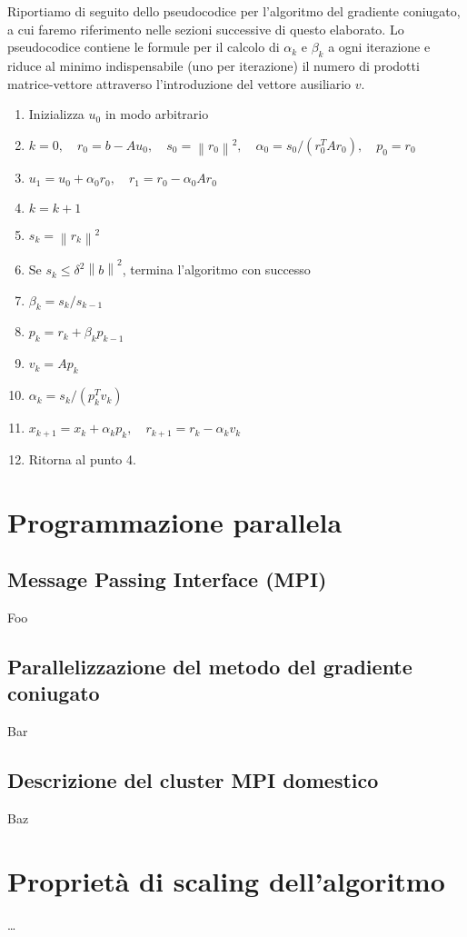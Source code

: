 \documentclass[a4paper,11pt]{article}
\newcommand{\norm}[1]{\left\lVert#1\right\rVert}
\begin{document}
Riportiamo di seguito dello pseudocodice per l'algoritmo
del gradiente coniugato, a cui faremo riferimento nelle
sezioni successive di questo elaborato.
Lo pseudocodice contiene le formule per il calcolo di
$\alpha_k$ e $\beta	_k$ a ogni iterazione e riduce al minimo
indispensabile (uno per iterazione) il numero di prodotti
matrice-vettore attraverso l'introduzione del vettore ausiliario $v$.
\begin{enumerate}
\item Inizializza $u_0$ in modo arbitrario
\item $k = 0, \quad r_0 = b - A u_0, \quad s_0 = \norm{r_0}^2,
\quad \alpha_0 = s_0/(r_0^T A r_0), \quad p_0 = r_0$
\item $u_1 = u_0 + \alpha_0 r_0, \quad r_1 = r_0 - \alpha_0 A r_0$
\item $k = k + 1$
\item $s_k = \norm{r_k}^2$
\item Se $s_k \leq \delta^2 \norm{b}^2$,
termina l'algoritmo con successo
\item $\beta_k = s_k / s_{k-1}$
\item $p_k = r_k + \beta_k p_{k-1}$
\item $v_k = A p_k$
\item $\alpha_k = s_k / (p_k^T v_k)$
\item $x_{k+1} = x_k + \alpha_k p_k, \quad r_{k+1} = r_k - \alpha_k v_k$
\item Ritorna al punto 4.
\end{enumerate}

\clearpage

\section{Programmazione parallela}
\subsection*{Message Passing Interface (MPI)}
Foo












\clearpage

\subsection*{Parallelizzazione del metodo del gradiente coniugato}
Bar

\subsection*{Descrizione del cluster MPI domestico}
Baz

\section{Proprietà di scaling dell'algoritmo}
\dots

\printbibliography[heading=bibintoc, title={Bibliography}]
\end{document}
